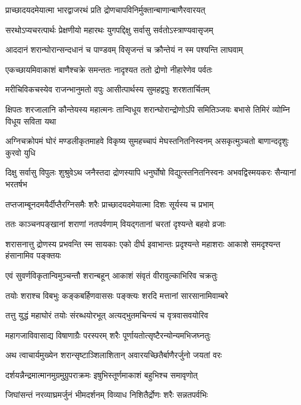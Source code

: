 \twolineshloka
{प्राच्छादयदमेयात्मा भारद्वाजरथं प्रति}
{द्रोणचापविनिर्मुक्तान्बाणान्बाणैरवारयत्}


\twolineshloka
{सरथोऽप्यचरत्पार्थः प्रेक्षणीयो महारथः}
{युगपद्दिक्षु सर्वासु सर्वतोऽस्त्राण्यवासृजम्}


\twolineshloka
{आददानं शरान्घोरान्सन्दधानं च पाण्डवम्}
{विसृजन्तं च क्रौन्तेयं न स्म पश्यन्ति लाघवाम्}


\twolineshloka
{एकच्छायमिवाकाशं बाणैश्चक्रे समन्ततः}
{नादृश्यत ततो द्रोणो नीहारेणेव पर्वतः}


\twolineshloka
{मरीचिविकचस्येव राजन्भानुमतो वपुः}
{आसीत्पार्थस्य सुमहद्वपुः शरशतार्चितम्}


\threelineshloka
{क्षिपतः शरजालानि कौन्तेयस्य महात्मनः}
{तान्विधूय शरान्घोरान्द्रोणोऽपि समितिञ्जयः}
{बभासे तिमिरं व्योम्नि विधूय सविता यथा}


\threelineshloka
{अग्निचक्रोपमं घोरं मण्डलीकृतमाहवे}
{विकृष्य सुमहच्चापं मेघस्तनितनिस्वनम्}
{असकृत्मुञ्चतो बाणान्ददृशुः कुरवो युधि}


\threelineshloka
{दिक्षु सर्वासु विपुलः शुश्रुवेऽथ जनैस्तदा}
{द्रोणस्यापि धनुर्घोषो विद्युत्स्तनितनिस्वनः}
{अभवद्विस्मयकरः सैन्यानां भरतर्षभ}


\twolineshloka
{तप्तजाम्बूनदमयैर्दीप्तैरग्निसमैः शरैः}
{प्राच्छादयदमेयात्मा दिशः सूर्यस्य च प्रभाम्}


\twolineshloka
{ततः काञ्चनपङ्खानां शराणां नतपर्वणाम्}
{वियद्गतानां चरतां दृश्यन्ते बहवो व्रजाः}


\threelineshloka
{शरासनात्तु द्रोणस्य प्रभवन्ति स्म सायकाः}
{एको दीर्घ इवाभान्तः प्रदृश्यन्ते महाशराः}
{आकाशे समदृश्यन्त हंसानामिव पङ्क्तयः}


\twolineshloka
{एवं सुवर्णविकृतान्विमुञ्चन्तौ शरान्बहून्}
{आकाशं संवृतं वीरावुल्काभिरिव चक्रतुः}


\twolineshloka
{तयोः शराश्च विबभुः कङ्कबर्हिणवाससः}
{पङ्क्त्यः शरदि मत्तानां सारसानामिवाम्बरे}


\twolineshloka
{तत्तु युद्धं महाघोरं तयोः संरब्धयोरभूत्}
{अत्यद्भुतमचिन्त्यं च वृत्रवासवयोरिव}


\twolineshloka
{महागजाविवासाद्य विषाणाग्रैः परस्परम्}
{शरैः पूर्णायतोत्सृष्टैरन्योन्यमभिजघ्नतुः}


\twolineshloka
{अथ त्वाचार्यमुख्येन शरान्सृष्टाञ्शिलाशितान्}
{अवारयच्छितैर्बाणैरर्जुनो जयतां वरः}


\twolineshloka
{दर्शयन्नैन्द्रमात्मानमुग्रमुग्रुपराक्रमः}
{इषुभिस्तूर्णमाकाशं बहुभिश्च समावृणोत्}



\twolineshloka
{जिघांसन्तं नरव्याघ्रमर्जुनं भीमदर्शनम्}
{विव्याध निशितैर्द्रोणः शरैः सन्नतपर्वभिः}


